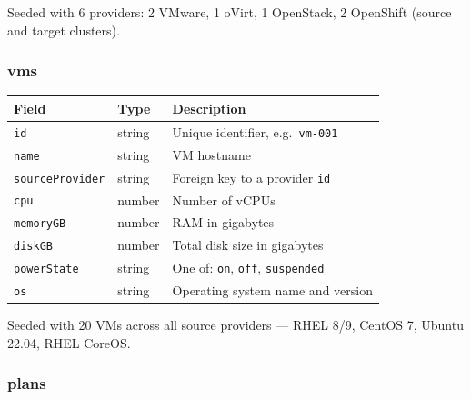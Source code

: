 \documentclass[12pt,a4paper]{article}
\begin{document}
Seeded with 6 providers: 2 VMware, 1 oVirt, 1 OpenStack, 2 OpenShift (source and target clusters).

\subsubsection{vms}

\begin{center}
\begin{tabular}{llL{6.5cm}}
  \toprule
  \textbf{Field} & \textbf{Type} & \textbf{Description} \\
  \midrule
  \texttt{id}             & string & Unique identifier, e.g.\ \texttt{vm-001} \\
  \texttt{name}           & string & VM hostname \\
  \texttt{sourceProvider} & string & Foreign key to a provider \texttt{id} \\
  \texttt{cpu}            & number & Number of vCPUs \\
  \texttt{memoryGB}       & number & RAM in gigabytes \\
  \texttt{diskGB}         & number & Total disk size in gigabytes \\
  \texttt{powerState}     & string & One of: \texttt{on}, \texttt{off}, \texttt{suspended} \\
  \texttt{os}             & string & Operating system name and version \\
  \bottomrule
\end{tabular}
\end{center}

Seeded with 20 VMs across all source providers — RHEL 8/9, CentOS 7, Ubuntu 22.04, RHEL CoreOS.

\subsubsection{plans}
\end{document}
